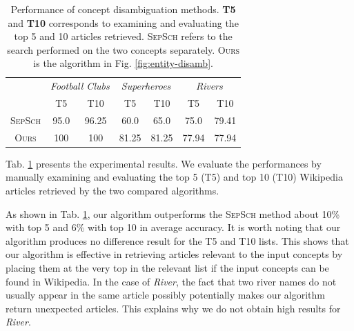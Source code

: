 \begin{table}[h]
  \begin{center}
    \begin{tabular}{|c||c|c|c|c|c|c|}
      \hline
      & \multicolumn{2}{c|}{{\em Football Clubs}} & \multicolumn{2}{c|}{{\em Superheroes}} & \multicolumn{2}{c|}{{\em Rivers}} \\
      \cline{2-7}  & T5 & T10 & T5 & T10 & T5 & T10 \\
      \hline
      \hline
      \textsc{SepSch} & 95.0 & 96.25 & 60.0    & 65.0   & 75.0   & 79.41 \\
      \textsc{Ours}  & 100  & 100    & 81.25 & 81.25 & 77.94 & 77.94  \\
      \hline
    \end{tabular}
    \caption{Performance of concept disambiguation
      methods. \textbf{T5} and \textbf{T10} corresponds to examining
      and evaluating the top 5 and 10 articles retrieved.
      \textnormal{\textsc{SepSch}} refers to the search performed on
      the two concepts separately. \textnormal{\textsc{Ours}} is the
      algorithm in Fig. \ref{fig:entity-disamb}.}
    \label{tab:exp-con-disamb}
  \end{center}
\end{table}

Tab. \ref{tab:exp-con-disamb} presents the experimental results. We
evaluate the performances by manually examining and evaluating the top
5 (T5) and top 10 (T10) Wikipedia articles retrieved by the two
compared algorithms.   As
shown in Tab. \ref{tab:exp-con-disamb}, our algorithm outperforms the
\textsc{SepSch} method about 10\% with top 5 and 6\% with top 10 in
average accuracy. It is worth noting that our algorithm produces no
difference result for the T5 and T10 lists. This shows that our
algorithm is effective in retrieving articles relevant to the input
concepts by placing them at the very top in the relevant list
if the input concepts can be found in Wikipedia. In the case of {\em
  River}, the fact that two river names do not usually appear in the
same article possibly potentially makes our algorithm return unexpected
articles. This explains why we do not obtain high results for
{\em River}.

